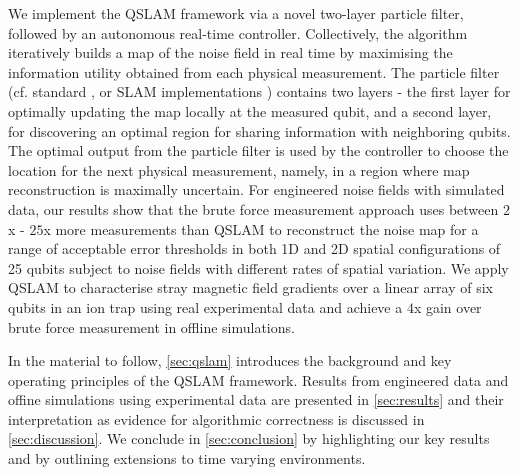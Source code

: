 We implement the QSLAM framework via a novel two-layer particle filter, followed by an autonomous real-time controller. Collectively, the algorithm iteratively builds a map of the noise field  in real time by maximising the information utility obtained from each physical measurement. The particle filter (cf. standard \cite{doucet2001introduction}, or SLAM implementations \cite{beevers2007fixed,grisettiyz2005improving,poterjoy2016localized})  contains two layers - the first layer for optimally updating the map locally at the measured qubit, and a second layer, for discovering an optimal region for sharing information with neighboring qubits. The optimal output from the particle filter is used by the  controller to choose the location for the next physical measurement, namely, in a region where map reconstruction is maximally uncertain. For engineered noise fields with simulated data, our results show that the brute force measurement approach uses between $2$x - $25$x more measurements than QSLAM to reconstruct the noise map for a range of acceptable error thresholds in both 1D and 2D spatial configurations of 25 qubits subject to noise fields with different rates of spatial variation. We apply QSLAM to characterise stray magnetic field gradients over a linear array of six qubits in an ion trap using real experimental data and achieve a $4$x gain over brute force measurement in offline simulations.

In the material to follow, \cref{sec:qslam} introduces the background and key operating principles of the QSLAM framework. Results from engineered data and offine simulations using experimental data are presented in \cref{sec:results} and their interpretation as evidence for algorithmic correctness is discussed in \cref{sec:discussion}. We conclude in \cref{sec:conclusion} by highlighting our key results and by outlining extensions to time varying environments.

 

